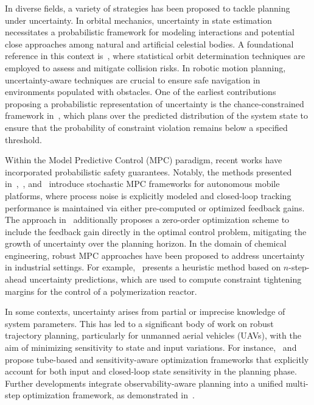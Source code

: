 In diverse fields, a variety of strategies has been proposed to tackle planning under uncertainty.
In orbital mechanics, uncertainty in state estimation necessitates a probabilistic framework for modeling interactions and potential close approaches among natural and artificial celestial bodies.
A foundational reference in this context is~\cite{Tapley:StatisticalOrbitDetermination:2004}, where statistical orbit determination techniques are employed to assess and mitigate collision risks. In robotic motion planning, uncertainty-aware techniques are crucial to ensure safe navigation in environments populated with obstacles. One of the earliest contributions proposing a probabilistic representation of uncertainty is the chance-constrained framework in~\cite{Blackmore:ChanceConstrainedOptimalPath:2011}, which plans over the predicted distribution of the system state to ensure that the probability of constraint violation remains below a specified threshold.

Within the Model Predictive Control (MPC) paradigm, recent works have incorporated probabilistic safety guarantees. Notably, the methods presented in~\cite{Gao:CollisionfreeMotionPlanning:2023},~\cite{Zhang:RobustifiedTimeoptimalPointtopoint:2025}, and~\cite{Zhang:RobustifiedTimeoptimalCollisionfree:2024} introduce stochastic MPC frameworks for autonomous mobile platforms, where process noise is explicitly modeled and closed-loop tracking performance is maintained via either pre-computed or optimized feedback gains. The approach in~\cite{Gao:CollisionfreeMotionPlanning:2023} additionally proposes a zero-order optimization scheme to include the feedback gain directly in the optimal control problem, mitigating the growth of uncertainty over the planning horizon.
In the domain of chemical engineering, robust MPC approaches have been proposed to address uncertainty in industrial settings. For example,~\cite{Krog:SimpleFastRobust:2024} presents a heuristic method based on $n$-step-ahead uncertainty predictions, which are used to compute constraint tightening margins for the control of a polymerization reactor.

In some contexts, uncertainty arises from partial or imprecise knowledge of system parameters. This has led to a significant body of work on robust trajectory planning, particularly for unmanned aerial vehicles (UAVs), with the aim of minimizing sensitivity to state and input variations. For instance,~\cite{Brault:RobustTrajectoryPlanning:2021} and~\cite{Giordano:TrajectoryGenerationMinimum:2018} propose tube-based and sensitivity-aware optimization frameworks that explicitly account for both input and closed-loop state sensitivity in the planning phase. Further developments integrate observability-aware planning into a unified multi-step optimization framework, as demonstrated in~\cite{Bohm:COPControlObservabilityaware:2022}.

